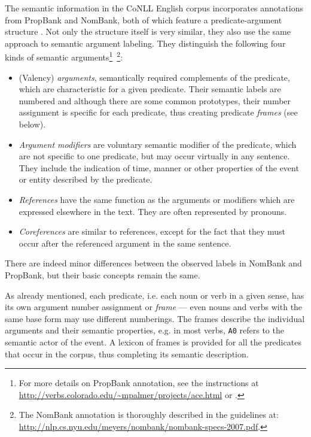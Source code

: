 \documentclass[12pt,notitlepage]{report}
\begin{document}
The semantic information in the CoNLL English corpus incorporates annotations from PropBank and NomBank, both of which feature a predicate-argument structure \citep[cf. Section \ref{problem} and][]{kingsbury02}. Not only the structure itself is very similar, they also use the same approach to semantic argument labeling. They distinguish the following four kinds of semantic arguments\footnote{For more details on PropBank annotation, see the instructions at \url{http://verbs.colorado.edu/~mpalmer/projects/ace.html} or \citep{moreda06}.}~\footnote{The NomBank annotation is thoroughly described in the guidelines at: \\ \url{http://nlp.cs.nyu.edu/meyers/nombank/nombank-specs-2007.pdf}.}:
\begin{itemize} 
    \item (Valency) \emph{arguments}, semantically required complements of the predicate, which are characteristic for a given predicate. Their semantic labels are numbered and although there are some common prototypes, their number assignment is specific for each predicate, thus creating predicate \emph{frames} (see below).
    \item \emph{Argument modifiers} are voluntary semantic modifier of the predicate, which are not specific to one predicate, but may occur virtually in any sentence. They include the indication of time, manner or other properties of the event or entity described by the predicate.
    \item \emph{References} have the same function as the arguments or modifiers which are expressed elsewhere in the text. They are often represented by pronouns.
    \item \emph{Coreferences} are similar to references, except for the fact that they must occur after the referenced argument in the same sentence.
\end{itemize}
There are indeed minor differences between the observed labels in NomBank and PropBank, but their basic concepts remain the same.

As already mentioned, each predicate, i.e. each noun or verb in a given sense, has its own argument number assignment or \emph{frame} --- even nouns and verbs with the same base form may use different numberings. The frames describe the individual arguments and their semantic properties, e.g. in most verbs, \texttt{A0} refers to the semantic actor of the event. A lexicon of frames is provided for all the predicates that occur in the corpus, thus completing its semantic description.
\end{document}
